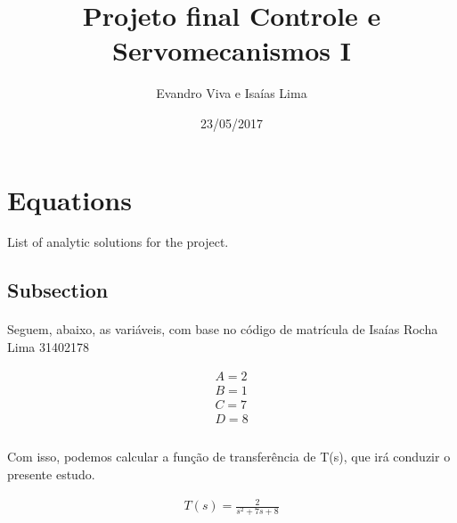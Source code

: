 \documentclass[12pt,a4paper]{article}
\title{Projeto final Controle e Servomecanismos I}
\date{23/05/2017}
\author{Evandro Viva e Isaías Lima}
\begin{document}
\maketitle
{}
\newpage
{}

\tableofcontents
\newpage

\section{Equations}

List of analytic solutions for the project.

\subsection{Subsection}

\paragraph{}
Seguem, abaixo, as variáveis, com base no código de matrícula de Isaías Rocha Lima 31402178

\begin{align}
    A = 2 \\
    B = 1 \\
    C = 7 \\
    D = 8 \\
\end{align}

\paragraph{}
Com isso, podemos calcular a função de transferência de T(s), que irá conduzir o presente estudo.

\begin{align}
    T(s) = \frac{2}{s^2 + 7s + 8}
\end{align}
\end{document}
